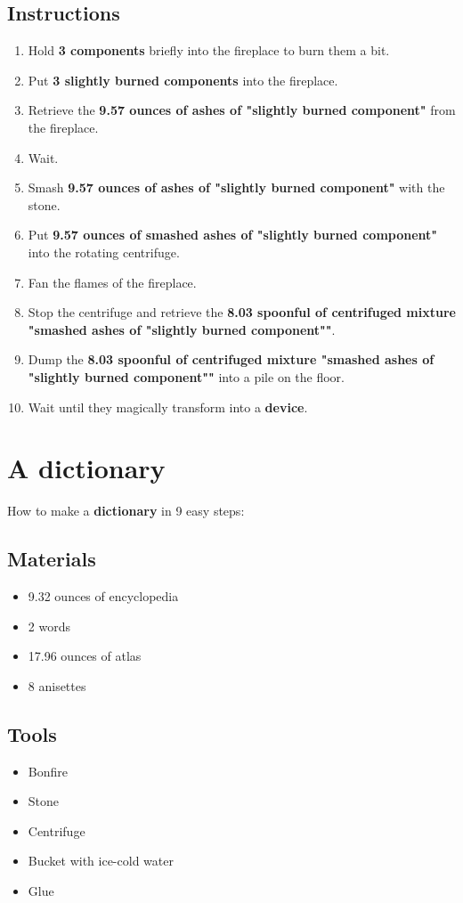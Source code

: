 \documentclass{article}
\begin{document}
\subsection{Instructions}\begin{enumerate}
\item 
Hold \textbf{3 components} briefly into the fireplace to burn them a bit.
\item 
Put \textbf{3 slightly burned components} into the fireplace.
\item 
Retrieve the \textbf{9.57 ounces of ashes of "slightly burned component"} from the fireplace.
\item 
Wait.
\item 
Smash \textbf{9.57 ounces of ashes of "slightly burned component"} with the stone.
\item 
Put \textbf{9.57 ounces of smashed ashes of "slightly burned component"} into the rotating centrifuge.
\item 
Fan the flames of the fireplace.
\item 
Stop the centrifuge and retrieve the \textbf{8.03 spoonful of centrifuged mixture "smashed ashes of "slightly burned component""}.
\item 
Dump the \textbf{8.03 spoonful of centrifuged mixture "smashed ashes of "slightly burned component""} into a pile on the floor.
\item 
Wait until they magically transform into a \textbf{device}.
\end{enumerate}
\newpage
\section{A dictionary}How to make a \textbf{dictionary} in 9 easy steps:

\subsection{Materials}\begin{itemize}
\item 
9.32 ounces of encyclopedia
\item 
2 words
\item 
17.96 ounces of atlas
\item 
8 anisettes
\end{itemize}
\subsection{Tools}\begin{itemize}
\item 
Bonfire
\item 
Stone
\item 
Centrifuge
\item 
Bucket with ice-cold water
\item 
Glue
\end{itemize}
\end{document}
